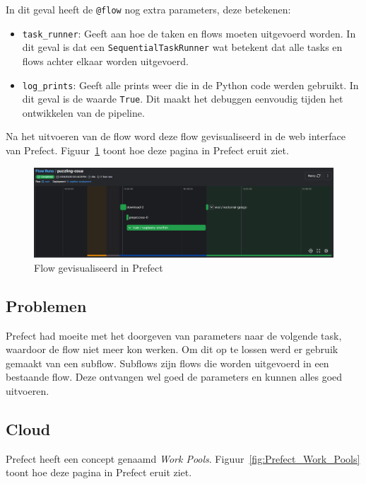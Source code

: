 In dit geval heeft de \texttt{@flow} nog extra parameters, deze betekenen:

\begin{itemize}
    \item \texttt{task\_runner}: Geeft aan hoe de taken en flows moeten uitgevoerd worden. In dit geval is dat een \texttt{SequentialTaskRunner} wat betekent dat alle tasks en flows achter elkaar worden uitgevoerd.
    \item \texttt{log\_prints}: Geeft alle prints weer die in de Python code werden gebruikt. In dit geval is de waarde \texttt{True}. Dit maakt het debuggen eenvoudig tijden het ontwikkelen van de pipeline.
\end{itemize}

Na het uitvoeren van de flow word deze flow gevisualiseerd in de web interface van Prefect. Figuur~\ref{fig:Prefect_Flow} toont hoe deze pagina in Prefect eruit ziet.
\begin{figure}
    \centering
    \includegraphics[width=0.9\linewidth]{graphics/Prefect_Flow.PNG}
    \caption{Flow gevisualiseerd in Prefect}
    \label{fig:Prefect_Flow}
\end{figure}

\subsection{Problemen}

Prefect had moeite met het doorgeven van parameters naar de volgende task, waardoor de flow niet meer kon werken. Om dit op te lossen werd er gebruik gemaakt van een subflow. Subflows zijn flows die worden uitgevoerd in een bestaande flow. Deze ontvangen wel goed de parameters en kunnen alles goed uitvoeren.

\subsection{Cloud}

Prefect heeft een concept genaamd \textit{Work Pools}. Figuur~\ref{fig:Prefect_Work_Pools} toont hoe deze pagina in Prefect eruit ziet.


